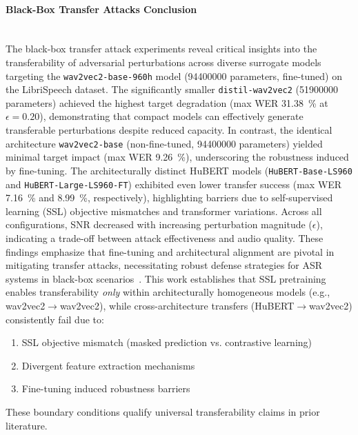 \documentclass[../main.tex]{subfiles}
\begin{document}
\paragraph{Black-Box Transfer Attacks Conclusion}\leavevmode\\
\label{subsec:transfer_attacks_conclusion}
The black-box transfer attack experiments reveal critical insights into the transferability of adversarial perturbations across diverse surrogate models targeting the \texttt{wav2vec2-base-960h} model (\num{94400000} parameters, fine-tuned) on the LibriSpeech dataset. The significantly smaller \texttt{distil-wav2vec2} (\num{51900000} parameters) achieved the highest target degradation (max WER \SI{31.38}{\percent} at \(\epsilon=0.20\)), demonstrating that compact models can effectively generate transferable perturbations despite reduced capacity. In contrast, the identical architecture \texttt{wav2vec2-base} (non-fine-tuned, \num{94400000} parameters) yielded minimal target impact (max WER \SI{9.26}{\percent}), underscoring the robustness induced by fine-tuning. The architecturally distinct HuBERT models (\texttt{HuBERT-Base-LS960} and \texttt{HuBERT-Large-LS960-FT}) exhibited even lower transfer success (max WER \SI{7.16}{\percent} and \SI{8.99}{\percent}, respectively), highlighting barriers due to self-supervised learning (SSL) objective mismatches and transformer variations. Across all configurations, SNR decreased with increasing perturbation magnitude (\(\epsilon\)), indicating a trade-off between attack effectiveness and audio quality. These findings emphasize that fine-tuning and architectural alignment are pivotal in mitigating transfer attacks, necessitating robust defense strategies for ASR systems in black-box scenarios~\cite{gao2024transferable,olivier2023transferable}. This work establishes that SSL pretraining enables transferability \textit{only} within architecturally homogeneous models (e.g., wav2vec2$\to$wav2vec2), while cross-architecture transfers (HuBERT$\to$wav2vec2) consistently fail due to:
\begin{enumerate}
\item SSL objective mismatch (masked prediction vs. contrastive learning)
\item Divergent feature extraction mechanisms
\item Fine-tuning induced robustness barriers
\end{enumerate}
These boundary conditions qualify universal transferability claims in prior literature.
\end{document}
